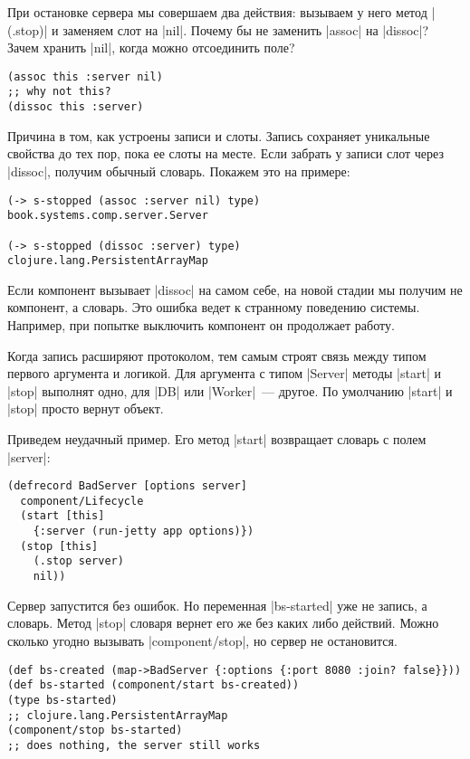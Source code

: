 При остановке сервера мы совершаем два действия: вызываем у него метод
\spverb|(.stop)| и заменяем слот на \spverb|nil|. Почему бы не заменить
\spverb|assoc| на \spverb|dissoc|? Зачем хранить \spverb|nil|, когда можно
отсоединить поле?

\begin{verbatim}
(assoc this :server nil)
;; why not this?
(dissoc this :server)
\end{verbatim}

Причина в том, как устроены записи и слоты. Запись сохраняет уникальные свойства
до тех пор, пока ее слоты на месте. Если забрать у записи слот через
\spverb|dissoc|, получим обычный словарь. Покажем это на примере:

\begin{verbatim}
(-> s-stopped (assoc :server nil) type)
book.systems.comp.server.Server

(-> s-stopped (dissoc :server) type)
clojure.lang.PersistentArrayMap
\end{verbatim}

Если компонент вызывает \spverb|dissoc| на самом себе, на новой стадии мы
получим не компонент, а словарь. Это ошибка ведет к странному поведению
системы. Например, при попытке выключить компонент он продолжает работу.

Когда запись расширяют протоколом, тем самым строят связь между типом первого
аргумента и логикой. Для аргумента с типом \spverb|Server| методы \spverb|start|
и \spverb|stop| выполнят одно, для \spverb|DB| или \spverb|Worker|~---
другое. По умолчанию \spverb|start| и \spverb|stop| просто вернут объект.



Приведем неудачный пример. Его метод \spverb|start| возвращает словарь с полем
\spverb|server|:

\begin{verbatim}
(defrecord BadServer [options server]
  component/Lifecycle
  (start [this]
    {:server (run-jetty app options)})
  (stop [this]
    (.stop server)
    nil))
\end{verbatim}

Сервер запустится без ошибок. Но переменная \spverb|bs-started| уже не запись, а
словарь. Метод \spverb|stop| словаря вернет его же без каких либо
действий. Можно сколько угодно вызывать \spverb|component/stop|, но сервер не
остановится.

\begin{verbatim}
(def bs-created (map->BadServer {:options {:port 8080 :join? false}}))
(def bs-started (component/start bs-created))
(type bs-started)
;; clojure.lang.PersistentArrayMap
(component/stop bs-started)
;; does nothing, the server still works
\end{verbatim}

